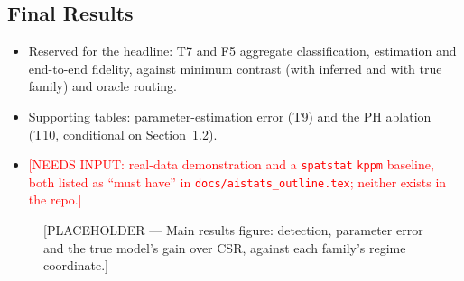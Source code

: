 \documentclass[twoside]{article}
\newcommand{\NI}[1]{\textcolor{red}{[NEEDS INPUT: #1]}}
\newcommand{\src}[1]{{\footnotesize\texttt{#1}}}
\begin{document}
\subsection{Final Results}
\begin{itemize}
  \item Reserved for the headline: T7 and F5 aggregate classification, estimation and end-to-end fidelity, against
        minimum contrast (with inferred and with true family) and oracle routing.
  \item Supporting tables: parameter-estimation error (T9) and the PH ablation (T10, conditional on Section~1.2).
  \item \NI{real-data demonstration and a \texttt{spatstat} \texttt{kppm} baseline, both listed as ``must have'' in
        \src{docs/aistats\_outline.tex}; neither exists in the repo.}
\end{itemize}

\begin{table}[t]
\caption{[PLACEHOLDER — Main results: classification, parameter error and end-to-end fidelity of the pipeline against
classical and oracle baselines.]}
\label{tab:main}
\end{table}

\begin{figure}[t]
\vspace{.3in}
\centerline{}
\vspace{.3in}
\caption{[PLACEHOLDER — Main results figure: detection, parameter error and the true model's gain over CSR,
against each family's regime coordinate.]}
\label{fig:main}
\end{figure}
\end{document}
